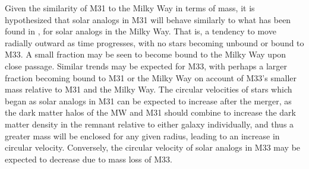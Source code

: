 \documentclass{aastex63}
\begin{document}
\indent Given the similarity of M31 to the Milky Way in terms of mass, it is hypothesized that solar analogs in M31 will behave similarly to what has been found in \cite{cox08}, \cite{van12} for solar analogs in the Milky Way. That is, a tendency to move radially outward as time progresses, with no stars becoming unbound or bound to M33. A small fraction may be seen to become bound to the Milky Way upon close passage. Similar trends may be expected for M33, with perhaps a larger fraction becoming bound to M31 or the Milky Way on account of M33's smaller mass relative to M31 and the Milky Way. The circular velocities of stars which began as solar analogs in M31 can be expected to increase after the merger, as the dark matter halos of the MW and M31 should combine to increase the dark matter density in the remnant relative to either galaxy individually, and thus a greater mass will be enclosed for any given radius, leading to an increase in circular velocity. Conversely, the circular velocity of solar analogs in M33 may be expected to decrease due to mass loss of M33. 

{}

\end{document}
